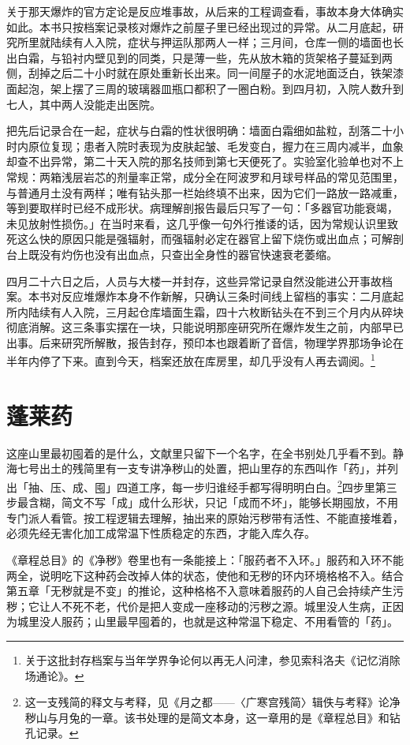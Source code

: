 关于那天爆炸的官方定论是反应堆事故，从后来的工程调查看，事故本身大体确实如此。本书只按档案记录核对爆炸之前屋子里已经出现过的异常。从二月底起，研究所里就陆续有人入院，症状与押运队那两人一样；三月间，仓库一侧的墙面也长出白霜，与铅衬内壁见到的同类，只是薄一些，先从放木箱的货架格子蔓延到两侧，刮掉之后二十小时就在原处重新长出来。同一间屋子的水泥地面泛白，铁架漆面起泡，架上摆了三周的玻璃器皿瓶口都积了一圈白粉。到四月初，入院人数升到七人，其中两人没能走出医院。

把先后记录合在一起，症状与白霜的性状很明确：墙面白霜细如盐粒，刮落二十小时内原位复现；患者入院时表现为皮肤起皱、毛发变白，握力在三周内减半，血象却查不出异常，第二十天入院的那名技师到第七天便死了。实验室化验单也对不上常规：两箱浅层岩芯的剂量率正常，成分全在阿波罗和月球号样品的常见范围里，与普通月土没有两样；唯有钻头那一栏始终填不出来，因为它们一路放一路减重，等到要取样时已经不成形状。病理解剖报告最后只写了一句：「多器官功能衰竭，未见放射性损伤。」在当时来看，这几乎像一句外行推诿的话，因为常规认识里致死这么快的原因只能是强辐射，而强辐射必定在器官上留下烧伤或出血点；可解剖台上既没有灼伤也没有出血点，只查出全身性的器官快速衰老萎缩。

四月二十六日之后，人员与大楼一并封存，这些异常记录自然没能进公开事故档案。本书对反应堆爆炸本身不作新解，只确认三条时间线上留档的事实：二月底起所内陆续有人入院，三月起仓库墙面生霜，四十六枚断钻头在不到三个月内从碎块彻底消解。这三条事实摆在一块，只能说明那座研究所在爆炸发生之前，内部早已出事。后来研究所解散，报告封存，预印本也跟着断了音信，物理学界那场争论在半年内停了下来。直到今天，档案还放在库房里，却几乎没有人再去调阅。\footnote{关于这批封存档案与当年学界争论何以再无人问津，参见索科洛夫《记忆消除场通论》。}

\section{蓬莱药}

这座山里最初囤着的是什么，文献里只留下一个名字，在全书别处几乎看不到。静海七号出土的残简里有一支专讲净秽山的处置，把山里存的东西叫作「药」，并列出「抽、压、成、囤」四道工序，每一步归谁经手都写得明明白白。\footnote{这一支残简的释文与考释，见《月之都——〈广寒宫残简〉辑佚与考释》论净秽山与月兔的一章。该书处理的是简文本身，这一章用的是《章程总目》和钻孔记录。}四步里第三步最含糊，简文不写「成」成什么形状，只记「成而不坏」，能够长期囤放，不用专门派人看管。按工程逻辑去理解，抽出来的原始污秽带有活性、不能直接堆着，必须先经无害化加工成常温下性质稳定的东西，才能入库久存。

《章程总目》的《净秽》卷里也有一条能接上：「服药者不入环。」服药和入环不能两全，说明吃下这种药会改掉人体的状态，使他和无秽的环内环境格格不入。结合第五章「无秽就是不变」的推论，这种格格不入意味着服药的人自己会持续产生污秽；它让人不死不老，代价是把人变成一座移动的污秽之源。城里没人生病，正因为城里没人服药；山里最早囤着的，也就是这种常温下稳定、不用看管的「药」。

